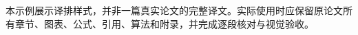 \documentclass[12pt,a4paper]{scrartcl}
\def\TranslationReferenceMode{native}%
\begin{document}
\makepapercover

\begin{translationnote}
本示例展示译排样式，并非一篇真实论文的完整译文。实际使用时应保留原论文所有章节、图表、公式、引用、算法和附录，并完成逐段核对与视觉验收。
\end{translationnote}



% 
% 


\ifstrequal{\TranslationReferenceMode}{pdf}{%
}{%
}
\end{document}
